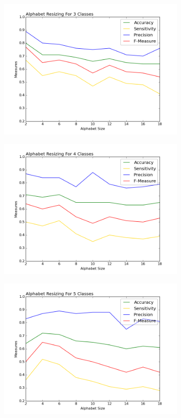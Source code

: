 \documentclass{mini}
\begin{document}
\begin{figure}
\begin{subfigure}{.5\textwidth}
  \includegraphics[width=1\linewidth]{images/a_c3_fig.png}
  \label{fig:sfig1}
\end{subfigure}%
\begin{subfigure}{.5\textwidth}
  \centering
  \includegraphics[width=1\linewidth]{images/a_c4_fig.png}
  \label{fig:sfig2}
\end{subfigure}
\begin{subfigure}{.5\textwidth}
  \centering
  \includegraphics[width=1\linewidth]{images/a_c5_fig.png}

\end{subfigure}
\end{figure}
\end{document}
